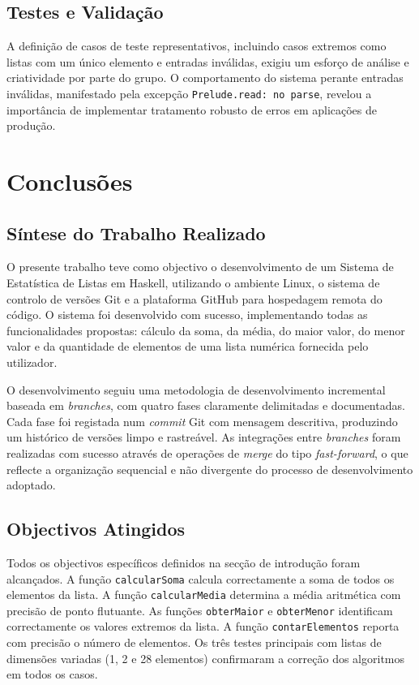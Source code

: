 \documentclass[12pt, a4paper, oneside]{report}
\begin{document}
\section{Testes e Validação}

A definição de casos de teste representativos, incluindo casos extremos como listas com um único elemento e entradas inválidas, exigiu um esforço de análise e criatividade por parte do grupo. O comportamento do sistema perante entradas inválidas, manifestado pela excepção \texttt{Prelude.read: no parse}, revelou a importância de implementar tratamento robusto de erros em aplicações de produção.

\chapter{Conclusões}

\section{Síntese do Trabalho Realizado}

O presente trabalho teve como objectivo o desenvolvimento de um Sistema de Estatística de Listas em Haskell, utilizando o ambiente Linux, o sistema de controlo de versões Git e a plataforma GitHub para hospedagem remota do código. O sistema foi desenvolvido com sucesso, implementando todas as funcionalidades propostas: cálculo da soma, da média, do maior valor, do menor valor e da quantidade de elementos de uma lista numérica fornecida pelo utilizador.

O desenvolvimento seguiu uma metodologia de desenvolvimento incremental baseada em \textit{branches}, com quatro fases claramente delimitadas e documentadas. Cada fase foi registada num \textit{commit} Git com mensagem descritiva, produzindo um histórico de versões limpo e rastreável. As integrações entre \textit{branches} foram realizadas com sucesso através de operações de \textit{merge} do tipo \textit{fast-forward}, o que reflecte a organização sequencial e não divergente do processo de desenvolvimento adoptado.

\section{Objectivos Atingidos}

Todos os objectivos específicos definidos na secção de introdução foram alcançados. A função \texttt{calcularSoma} calcula correctamente a soma de todos os elementos da lista. A função \texttt{calcularMedia} determina a média aritmética com precisão de ponto flutuante. As funções \texttt{obterMaior} e \texttt{obterMenor} identificam correctamente os valores extremos da lista. A função \texttt{contarElementos} reporta com precisão o número de elementos. Os três testes principais com listas de dimensões variadas (1, 2 e 28 elementos) confirmaram a correção dos algoritmos em todos os casos.
\end{document}
